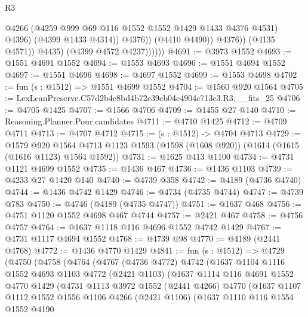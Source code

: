 \begin{lexlean}{R3}
\begin{coremodule}
                                @4266
                                (@4259 @999 @69 @116 @1552 @1552 @1429 @1433 @4376 @4531)
                                @4396)
                              (@4399 @1433 @4314))
                            @4376))
                        (@4410 @4490))
                      @4376))
                  (@4135 @4571))
                @4435)
              (@4399 @4572 @4237))))))
@4691 := @3973 @1552
@4693 := @1551 @4691 @1552
@4694 := @1553 @4693
@4696 := @1551 @4694 @1552
@4697 := @1551 @4696
@4698 := @4697 @1552
@4699 := @1553 @4698
@4702 := fun (s : @1512) => @1551 @4699 @1552
@4704 := @1560 @920 @1564
@4705 := LexLeanPreserve.C57d2b4c8bd4b72c39cb04c4904c713c3.R3.__fits_25
@4706 := @4705 @1425
@4707 := @1566 @4706
@4709 := @1455 @27 @140
@4710 := Reasoning.Planner.Pour.candidates
@4711 := @4710 @1425
@4712 := @4709 @4711
@4713 := @4707 @4712
@4715 := (s : @1512) -> @4704 @4713
@4729 := @1579
    @920
    @1564
    @4713
    @1123
    @1593
    (@1598 (@1608 @920))
    (@1614 (@1615 (@1616 @1123) @1564 @1592))
@4731 := @1625 @413 @1100
@4734 := @4731 @1121 @4699 @1552
@4735 := @1436 @467
@4736 := @1436 @1103
@4739 := @4233 @27 @1420 @140
@4740 := @4739 @358
@4742 := @4189 (@4736 @4740)
@4744 := @1436 @4742 @1429
@4746 := @4734 (@4735 @4744)
@4747 := @4739 @783
@4750 := @4746 (@4189 (@4735 @4747))
@4751 := @1637 @468
@4756 := @4751 @1120 @1552 @4698 @467 @4744
@4757 := @2421 @467
@4758 := @4756 @4757
@4764 := @1637 @1118 @116 @4696 @1552 @4742 @1429
@4767 := @4731 @1117 @4694 @1552
@4768 := @4739 @98
@4770 := @4189 (@2441 @4768)
@4772 := @1436 @4770 @1429
@4841 := fun (s : @1512) =>
  @4729
    (@4750
      (@4758
        (@4764
          (@4767
            (@4736 @4772)
            @4742
            (@1637
              @1104
              @1116
              @1552
              @4693
              @1103
              @4772
              (@2421 @1103)
              (@1637
                @1114
                @116
                @4691
                @1552
                @4770
                @1429
                (@4731
                  @1113
                  @3972
                  @1552
                  (@2441 @4266)
                  @4770
                  (@1637
                    @1107
                    @1112
                    @1552
                    @1556
                    @1106
                    @4266
                    (@2421 @1106)
                    (@1637
                      @1110
                      @116
                      @1554
                      @1552
                      @4190

\end{coremodule}
\end{lexlean}
